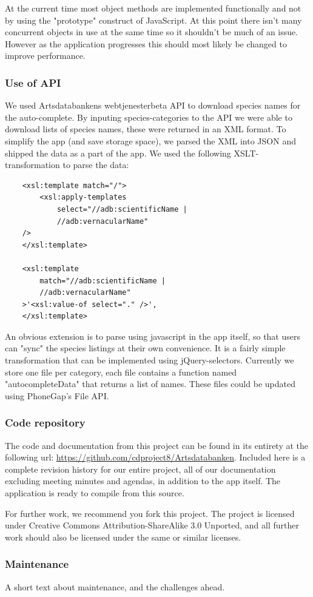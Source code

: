 At the current time most object methods are implemented functionally and not by
using the "prototype" construct of JavaScript.  At this point there isn't many
concurrent objects in use at the same time so it shouldn't be much of an issue.
However as the application progresses this should most likely be changed to
improve performance.

\subsubsection{Use of API}

We used Artsdatabankens webtjenesterbeta API to download species names for the
auto-complete. By inputing species-categories to the API we were able to
download lists of species names, these were returned in an XML format. To
simplify the app (and save storage space), we parsed the XML into JSON and
shipped the data as a part of the app. We used the following XSLT-transformation
to parse the data:

\begin{lstlisting}
	<xsl:template match="/">
		<xsl:apply-templates 
			select="//adb:scientificName | 
			//adb:vernacularName" 
	/>
	</xsl:template>

	<xsl:template 
		match="//adb:scientificName | 
		//adb:vernacularName"
	>'<xsl:value-of select="." />',
	</xsl:template>
\end{lstlisting}

An obvious extension is to parse using javascript in the app itself, so
that users can "sync" the species listings at their own convenience. It is a
fairly simple transformation that can be implemented using jQuery-selectors.
Currently we store one file per category, each file contains a function named
"autocompleteData" that returns a list of names. These files could be updated
using PhoneGap's File API.

\subsubsection{Code repository}

The code and documentation from this project can be found in its entirety at
the following url: \url{https://github.com/cdproject8/Artsdatabanken}. Included
here is a complete revision history for our entire project, all of our
documentation excluding meeting minutes and agendas, in addition to the app
itself. The application is ready to compile from this source.

For further work, we recommend you fork this project. The project is licensed
under Creative Commons Attribution-ShareAlike 3.0 Unported, and all further
work should also be licensed under the same or similar licenses.

\subsubsection{Maintenance}
A short text about maintenance, and the challenges ahead.
